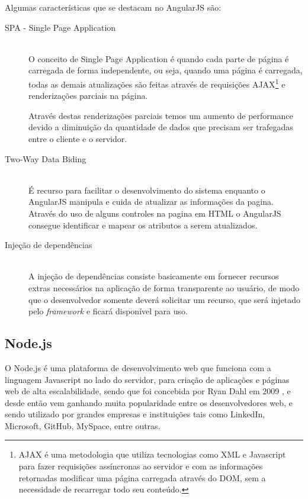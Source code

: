 Algumas características que se destacam no AngularJS são:
\begin{description}
\item[SPA - Single Page Application] \hfill \\ 
O conceito de Single Page Application é  quando cada parte de página é carregada de forma independente, ou seja, quando uma página é carregada, todas as demais atualizações são feitas através de requisições AJAX\footnote{AJAX é uma metodologia que utiliza tecnologias como XML e Javascript para fazer requisições assíncronas ao servidor e com as informações retornadas modificar uma página carregada através do DOM, sem a necessidade de recarregar todo seu conteúdo.} e renderizações parciais na página.

    Através destas renderizações parciais temos um aumento de performance devido a diminuição da quantidade de dados que precisam ser trafegadas entre o cliente e o servidor.

\item[Two-Way Data Biding] \hfill \\
É recurso para facilitar o desenvolvimento do sistema enquanto o AngularJS manipula e cuida de atualizar as informações da pagina. Através do uso de alguns controles na pagina em HTML o AngularJS consegue identificar e mapear os atributos a serem atualizados.

\item[Injeção de dependências] \hfill \\
A injeção de dependências consiste basicamente  em fornecer recursos extras necessários na aplicação de forma transparente ao usuário, de modo que o desenvolvedor somente deverá solicitar um recurso, que será injetado pelo \textit{framework} e ficará disponível para uso.
\end{description}

\subsection{Node.js}
\label{subsec: Node.js}
\nocite{poeNode}
\nocite{MongoNode}
O Node.js é uma plataforma de desenvolvimento web que funciona com a linguagem Javascript no lado do servidor, para criação de aplicações e páginas web de alta escalabilidade, sendo que foi concebida por  Ryan Dahl em 2009 \nocite{appRealTime}, e desde então vem ganhando muita popularidade entre os desenvolvedores web, e sendo utilizado por grandes empresas e instituições tais como LinkedIn, Microsoft, GitHub, MySpace, entre outras\cite{compNode}.

